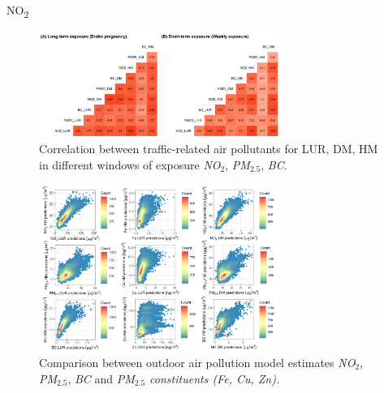 \documentclass{article}
\begin{document}
NO\textsubscript{2}

\captionsetup[figure]{skip=6pt}
\begin{figure}[!htb]
\includegraphics[width=0.7\textwidth]{figures/correlation_fig.png}
\caption{Correlation between traffic-related air pollutants for LUR, DM, HM in different windows of exposure \textit{NO$_2$}, \textit{PM$_{2.5}$}, \textit{BC}.}
\label{fig5}
\end{figure}



\newpage


\captionsetup[figure]{skip=6pt}
\begin{figure}[!htb]
\includegraphics[width=0.7\textwidth]{figures/final_HEXBIN.png}
\caption{Comparison between outdoor air pollution model estimates \textit{NO$_2$}, \textit{PM$_{2.5}$}, \textit{BC} and \textit{PM$_{2.5}$ constituents (Fe, Cu, Zn).}}
\label{fig6}
\end{figure}
\end{document}
